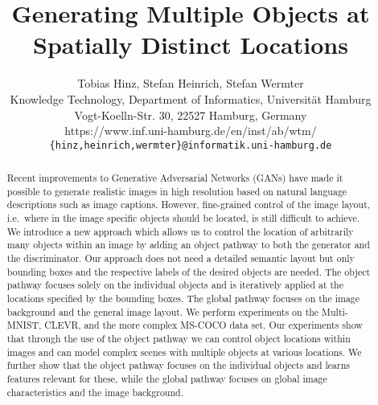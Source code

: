 \documentclass{article} \usepackage{iclr2019_conference,times}
\title{Generating Multiple Objects at \\Spatially Distinct Locations}
\author{Tobias Hinz, Stefan Heinrich, Stefan Wermter \\
	Knowledge Technology, Department of Informatics, Universit\"at Hamburg\\
	Vogt-Koelln-Str. 30, 22527 Hamburg, Germany\\
	https://www.inf.uni-hamburg.de/en/inst/ab/wtm/\\
	\texttt{\{hinz,heinrich,wermter\}@informatik.uni-hamburg.de}
}
\newif\ifappendix
\begin{document}
	
\appendixtrue


	\maketitle
	
	\begin{abstract}
		Recent improvements to Generative Adversarial Networks (GANs) have made it possible to generate realistic images in high resolution based on natural language descriptions such as image captions.
		However, fine-grained control of the image layout, i.e.\ where in the image specific objects should be located, is still difficult to achieve.
		We introduce a new approach which allows us to control the location of arbitrarily many objects within an image by adding an object pathway to both the generator and the discriminator.
		Our approach does not need a detailed semantic layout but only bounding boxes and the respective labels of the desired objects are needed.
		The object pathway focuses solely on the individual objects and is iteratively applied at the locations specified by the bounding boxes.
		The global pathway focuses on the image background and the general image layout.
We perform experiments on the Multi-MNIST, CLEVR, and the more complex MS-COCO data set.
		Our experiments show that through the use of the object pathway we can control object locations within images and can model complex scenes with multiple objects at various locations.
		We further show that the object pathway focuses on the individual objects and learns features relevant for these, while the global pathway focuses on global image characteristics and the image background.
	\end{abstract}
	
	
\end{document}
